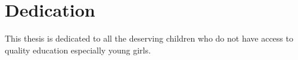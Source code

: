 \chapter*{Dedication}
This thesis is dedicated to all the deserving children who do not have access to quality education especially young girls.
